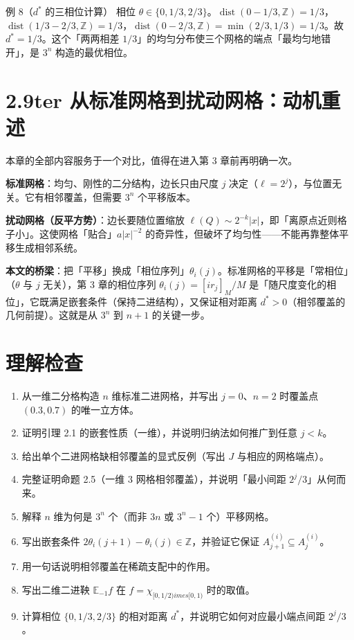 \documentclass[a4paper,11pt,openany]{ctexbook}
\numberwithin{equation}{chapter}
\numberwithin{figure}{chapter}
\numberwithin{table}{chapter}
\begin{document}
\begin{examplebox}{例 8（$d^*$ 的三相位计算）}
相位 $\theta\in\{0,1/3,2/3\}$。$\operatorname{dist}(0-1/3,\mathbb Z)=1/3$，$\operatorname{dist}(1/3-2/3,\mathbb Z)=1/3$，$\operatorname{dist}(0-2/3,\mathbb Z)=\min(2/3,1/3)=1/3$。故 $d^*=1/3$。这个「两两相差 $1/3$」的均匀分布使三个网格的端点「最均匀地错开」，是 $3^n$ 构造的最优相位。
\end{examplebox}

\section{2.9ter 从标准网格到扰动网格：动机重述}

本章的全部内容服务于一个对比，值得在进入第 3 章前再明确一次。

\textbf{标准网格}：均匀、刚性的二分结构，边长只由尺度 $j$ 决定（$\ell=2^j$），与位置无关。它有相邻覆盖，但需要 $3^n$ 个平移版本。

\textbf{扰动网格（反平方势）}：边长要随位置缩放 $\ell(Q)\sim 2^{-k}|x|$，即「离原点近则格子小」。这使网格「贴合」$a|x|^{-2}$ 的奇异性，但破坏了均匀性——不能再靠整体平移生成相邻系统。

\textbf{本文的桥梁}：把「平移」换成「相位序列」$\theta_i(j)$。标准网格的平移是「常相位」（$\theta$ 与 $j$ 无关），第 3 章的相位序列 $\theta_i(j)=[ir_j]_M/M$ 是「随尺度变化的相位」，它既满足嵌套条件（保持二进结构），又保证相对距离 $d^*>0$（相邻覆盖的几何前提）。这就是从 $3^n$ 到 $n+1$ 的关键一步。

\section{理解检查}

\begin{enumerate}
\item 从一维二分格构造 $n$ 维标准二进网格，并写出 $j=0$、$n=2$ 时覆盖点 $(0.3,0.7)$ 的唯一立方体。
\item 证明引理 2.1 的嵌套性质（一维），并说明归纳法如何推广到任意 $j<k$。
\item 给出单个二进网格缺相邻覆盖的显式反例（写出 $J$ 与相应的网格端点）。
\item 完整证明命题 2.5（一维 $3$ 网格相邻覆盖），并说明「最小间距 $2^j/3$」从何而来。
\item 解释 $n$ 维为何是 $3^n$ 个（而非 $3n$ 或 $3^n-1$ 个）平移网格。
\item 写出嵌套条件 $2\theta_i(j+1)-\theta_i(j)\in\mathbb Z$，并验证它保证 $A_{j+1}^{(i)}\subseteq A_j^{(i)}$。
\item 用一句话说明相邻覆盖在稀疏支配中的作用。
\item 写出二维二进鞅 $\mathbb E_{-1}f$ 在 $f=\chi_{[0,1/2)	imes[0,1)}$ 时的取值。
\item 计算相位 $\{0,1/3,2/3\}$ 的相对距离 $d^*$，并说明它如何对应最小端点间距 $2^j/3$。
\end{enumerate}
\end{document}
